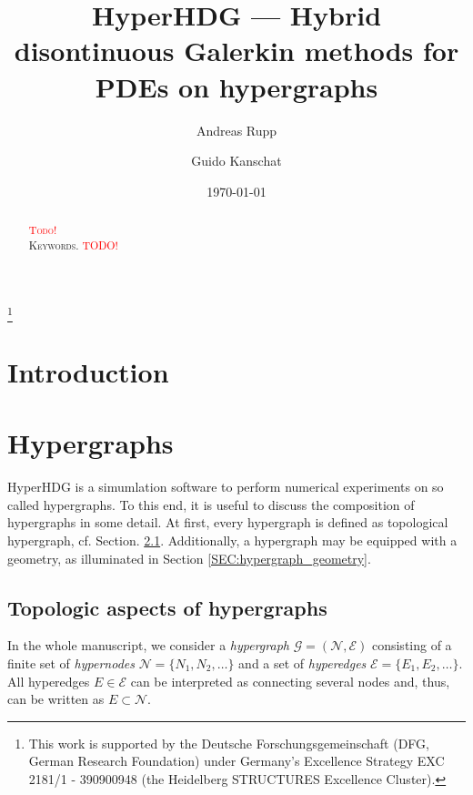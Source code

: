 \documentclass[a4paper, english, 12pt, reqno, draft]{amsart}
\theoremstyle{definition}
\theoremstyle{remark}
\numberwithin{equation}{section}
\newcommand{\graph}{\ensuremath{\mathcal G}}
\newcommand{\setEdge}{\ensuremath{\mathcal E}}
\newcommand{\setNode}{\ensuremath{\mathcal N}}
\newcommand{\edge}{\ensuremath{E}}
\newcommand{\node}{\ensuremath{N}}
\begin{document}
\title[H\MakeLowercase{yper}HDG]{H\MakeLowercase{yper}HDG --- Hybrid disontinuous Galerkin methods for PDEs on hypergraphs} 

\author{Andreas Rupp}
\address{Interdisciplinary Center for Scientific Computing (IWR), Heidelberg University, Mathematikon, Im Neuenheimer Feld 205, 69120 Heidelberg, Germany}
\thanks{This work is supported by the Deutsche Forschungsgemeinschaft (DFG, German Research Foundation) under Germany's Excellence Strategy EXC 2181/1 - 390900948 (the Heidelberg STRUCTURES Excellence Cluster).}

\author{Guido Kanschat}
\address{Interdisciplinary Center for Scientific Computing (IWR) and Mathematics Center Heidelberg (MATCH), Heidelberg University, Mathematikon, Im Neuenheimer Feld 205, 69120 Heidelberg, Germany}

\subjclass[2010]{\textcolor{red}{TODO}}

\date{\today}


\begin{abstract}
 \textcolor{red}{\textsc{Todo!}} 
 \\[1ex] \noindent \textsc{Keywords.}
 \textcolor{red}{TODO!}
\end{abstract}
% 
\maketitle
% 
\section{Introduction}
% 
\section{Hypergraphs}\label{SEC:hypergraph}
% 
HyperHDG is a simumlation software to perform numerical experiments on so called hypergraphs. To this end, it is useful to discuss the composition of hypergraphs in some detail. At first, every hypergraph is defined as topological hypergraph, cf. Section. \ref{SEC:hypergraph_topology}. Additionally, a hypergraph may be equipped with a geometry, as illuminated in Section \ref{SEC:hypergraph_geometry}. 
% 
\subsection{Topologic aspects of hypergraphs}\label{SEC:hypergraph_topology}
% 
In the whole manuscript, we consider a \emph{hypergraph} $\graph = (\setNode,\setEdge)$ consisting of a finite set of \emph{hypernodes} $\setNode = \{\node_1, \node_2, \ldots \}$ and a set of \emph{hyperedges} $\setEdge = \{\edge_1, \edge_2, \ldots \}$. All hyperedges $\edge \in \setEdge$ can be interpreted as connecting several nodes and, thus, can be written as $\edge \subset \setNode$.
\end{document}
